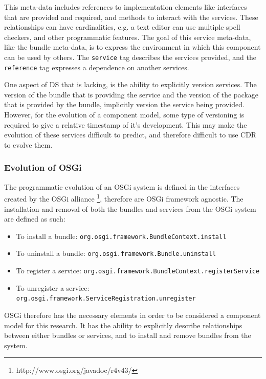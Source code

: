 This meta-data includes references to implementation elements like interfaces that are provided and required, and methods to interact with the services.
These relationships can have cardinalities, e.g. a text editor can use multiple spell checkers, and other programmatic features.
The goal of this service meta-data, like the bundle meta-data, is to express the environment in which this component can be used by others.
The \verb+service+ tag describes the services provided, and the \verb+reference+ tag expresses a dependence on another services.

One aspect of DS that is lacking, is the ability to explicitly version services.
The version of the bundle that is providing the service and the version of the package that is provided by the bundle, implicitly version the service being provided.
However, for the evolution of a component model, some type of versioning is required to give a relative timestamp of it's development.
This may make the evolution of these services difficult to predict, and therefore difficult to use CDR to evolve them. 


\subsubsection{Evolution of OSGi}
The programmatic evolution of an OSGi system is defined in the interfaces created by the OSGi alliance \footnote{http://www.osgi.org/javadoc/r4v43/}, therefore are OSGi framework agnostic.
The installation and removal of both the bundles and services from the OSGi system are defined as such:
 
\begin{itemize}
  \item To install a bundle: \verb+org.osgi.framework.BundleContext.install+
  \item To uninstall a bundle: \verb+org.osgi.framework.Bundle.uninstall+
  \item To register a service: \verb+org.osgi.framework.BundleContext.registerService+
  \item To unregister a service: \verb+org.osgi.framework.ServiceRegistration.unregister+
\end{itemize}

OSGi therefore has the necessary elements in order to be considered a component model for this research. 
It has the ability to explicitly describe relationships between either bundles or services, and to install and remove bundles from the system.

